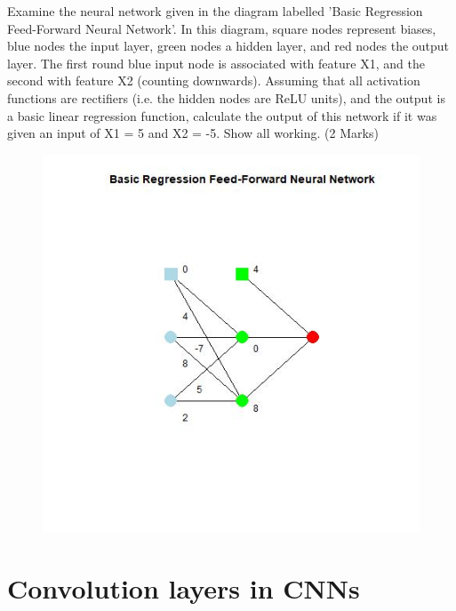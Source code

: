 \documentclass{article}
\begin{document}
Examine the neural network given in the diagram labelled 'Basic Regression Feed-Forward Neural Network'. In this diagram, square nodes represent biases, blue nodes the input layer, green nodes a hidden layer, and red nodes the output layer. The first round blue input node is associated with feature X1, and the second with feature X2 (counting downwards). Assuming that all activation functions are rectifiers (i.e. the hidden nodes are ReLU units), and the output is a basic linear regression function, calculate the output of this network if it was given an input of X1 = 5 and X2 = -5. Show all working. (2 Marks)

\begin{figure}[h!]
\includegraphics[width=\textwidth]{ffnn.jpg}
\end{figure}
\clearpage
\section{Convolution layers in CNNs}
\end{document}
